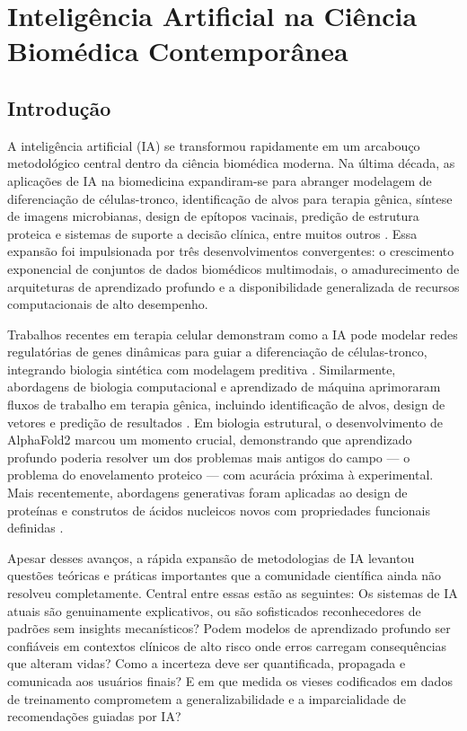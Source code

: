 
\chapter{Inteligência Artificial na Ciência Biomédica Contemporânea}

\section{Introdução}

A inteligência artificial (IA) se transformou rapidamente em um arcabouço metodológico central dentro da ciência biomédica moderna. Na última década, as aplicações de IA na biomedicina expandiram-se para abranger modelagem de diferenciação de células-tronco, identificação de alvos para terapia gênica, síntese de imagens microbianas, design de epítopos vacinais, predição de estrutura proteica e sistemas de suporte a decisão clínica, entre muitos outros \parencite{topol2019, jumper2021}. Essa expansão foi impulsionada por três desenvolvimentos convergentes: o crescimento exponencial de conjuntos de dados biomédicos multimodais, o amadurecimento de arquiteturas de aprendizado profundo e a disponibilidade generalizada de recursos computacionais de alto desempenho.

Trabalhos recentes em terapia celular demonstram como a IA pode modelar redes regulatórias de genes dinâmicas para guiar a diferenciação de células-tronco, integrando biologia sintética com modelagem preditiva \parencite{choudhury2025}. Similarmente, abordagens de biologia computacional e aprendizado de máquina aprimoraram fluxos de trabalho em terapia gênica, incluindo identificação de alvos, design de vetores e predição de resultados \parencite{danaeifar2025}. Em biologia estrutural, o desenvolvimento de AlphaFold2 \parencite{jumper2021} marcou um momento crucial, demonstrando que aprendizado profundo poderia resolver um dos problemas mais antigos do campo --- o problema do enovelamento proteico --- com acurácia próxima à experimental. Mais recentemente, abordagens generativas foram aplicadas ao design de proteínas e construtos de ácidos nucleicos novos com propriedades funcionais definidas \parencite{ferruz2022}.

Apesar desses avanços, a rápida expansão de metodologias de IA levantou questões teóricas e práticas importantes que a comunidade científica ainda não resolveu completamente. Central entre essas estão as seguintes: Os sistemas de IA atuais são genuinamente explicativos, ou são sofisticados reconhecedores de padrões sem insights mecanísticos? Podem modelos de aprendizado profundo ser confiáveis em contextos clínicos de alto risco onde erros carregam consequências que alteram vidas? Como a incerteza deve ser quantificada, propagada e comunicada aos usuários finais? E em que medida os vieses codificados em dados de treinamento comprometem a generalizabilidade e a imparcialidade de recomendações guiadas por IA?

